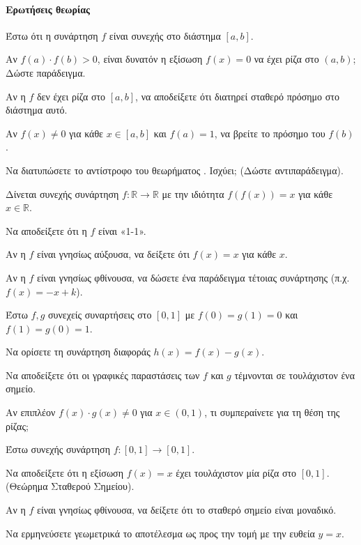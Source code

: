 \documentclass[11pt,a4paper,modern]{FFExercises}
\begin{document}

\paragraph{Ερωτήσεις θεωρίας}
\askhsh
Έστω ότι η συνάρτηση $f$ είναι συνεχής στο διάστημα $[a,b]$.
\begin{alist}
    \item Αν $f(a) \cdot f(b) > 0$, είναι δυνατόν η εξίσωση $f(x)=0$ να έχει ρίζα στο $(a,b)$; Δώστε παράδειγμα.
    \item Αν η $f$ δεν έχει ρίζα στο $[a,b]$, να αποδείξετε ότι διατηρεί σταθερό πρόσημο στο διάστημα αυτό.
    \item Αν $f(x) \ne 0$ για κάθε $x \in [a,b]$ και $f(a)=1$, να βρείτε το πρόσημο του $f(b)$.
    \item Να διατυπώσετε το αντίστροφο του θεωρήματος . Ισχύει; (Δώστε αντιπαράδειγμα).
\end{alist}

\askhsh
Δίνεται συνεχής συνάρτηση $f: \mathbb{R} \to \mathbb{R}$ με την ιδιότητα $f(f(x)) = x$ για κάθε $x \in \mathbb{R}$.
\begin{alist}
    \item Να αποδείξετε ότι η $f$ είναι «1-1».
    \item Αν η $f$ είναι γνησίως αύξουσα, να δείξετε ότι $f(x)=x$ για κάθε $x$.
    \item Αν η $f$ είναι γνησίως φθίνουσα, να δώσετε ένα παράδειγμα τέτοιας συνάρτησης (π.χ. $f(x)=-x+k$).
\end{alist}

\askhsh
Έστω $f, g$ συνεχείς συναρτήσεις στο $[0,1]$ με $f(0)=g(1)=0$ και $f(1)=g(0)=1$.
\begin{alist}
    \item Να ορίσετε τη συνάρτηση διαφοράς $h(x)=f(x)-g(x)$.
    \item Να αποδείξετε ότι οι γραφικές παραστάσεις των $f$ και $g$ τέμνονται σε τουλάχιστον ένα σημείο.
    \item Αν επιπλέον $f(x) \cdot g(x) \ne 0$ για $x \in (0,1)$, τι συμπεραίνετε για τη θέση της ρίζας;
\end{alist}

\askhsh
Έστω συνεχής συνάρτηση $f: [0,1] \to [0,1]$.
\begin{alist}
    \item Να αποδείξετε ότι η εξίσωση $f(x)=x$ έχει τουλάχιστον μία ρίζα στο $[0,1]$. (Θεώρημα Σταθερού Σημείου).
    \item Αν η $f$ είναι γνησίως φθίνουσα, να δείξετε ότι το σταθερό σημείο είναι μοναδικό.
    \item Να ερμηνεύσετε γεωμετρικά το αποτέλεσμα ως προς την τομή με την ευθεία $y=x$.
\end{alist}
\end{document}
